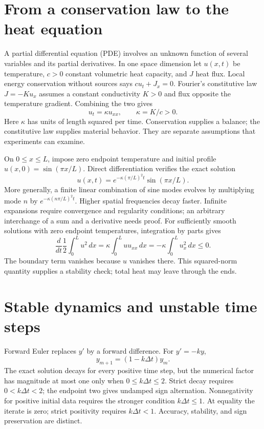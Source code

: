 \section{From a conservation law to the heat equation}
A partial differential equation (PDE) involves an unknown function of several
variables and its partial derivatives. In one space dimension let $u(x,t)$
be temperature, $c>0$ constant volumetric heat capacity, and $J$ heat flux.
Local energy conservation without sources says $cu_t+J_x=0$. Fourier's
constitutive law $J=-K u_x$ assumes a constant conductivity $K>0$ and flux
opposite the temperature gradient. Combining the two gives
\[
 u_t=\kappa u_{xx},\qquad\kappa=K/c>0.
\]
Here $\kappa$ has units of length squared per time. Conservation supplies
a balance; the constitutive law supplies material behavior. They are separate
assumptions that experiments can examine.

On $0\leq x\leq L$, impose zero endpoint temperature and initial profile
$u(x,0)=\sin(\pi x/L)$. Direct differentiation verifies the exact solution
\[
 u(x,t)=e^{-\kappa(\pi/L)^2t}\sin(\pi x/L).
\]
More generally, a finite linear combination of sine modes evolves by
multiplying mode $n$ by $e^{-\kappa(n\pi/L)^2t}$. Higher spatial frequencies
decay faster. Infinite expansions require convergence and regularity
conditions; an arbitrary interchange of a sum and a derivative needs proof.
For sufficiently smooth solutions with zero endpoint temperatures,
integration by parts gives
\[
 \frac{d}{dt}\frac12\int_0^L u^2\,dx
 =\kappa\int_0^Luu_{xx}\,dx=-\kappa\int_0^L u_x^2\,dx\leq0.
\]
The boundary term vanishes because $u$ vanishes there. This squared-norm
quantity supplies a stability check; total heat may leave through the ends.

\section{Stable dynamics and unstable time steps}
Forward Euler replaces $y'$ by a forward difference. For $y'=-ky$,
\[
 y_{m+1}=(1-k\Delta t)y_m.
\]
The exact solution decays for every positive time step, but the numerical
factor has magnitude at most one only when $0\leq k\Delta t\leq2$.
Strict decay requires $0<k\Delta t<2$; the endpoint two gives undamped
sign alternation. Nonnegativity for positive initial data requires the stronger
condition $k\Delta t\leq1$. At equality the iterate is zero; strict positivity requires $k\Delta t<1$.
Accuracy, stability, and sign preservation are distinct.

